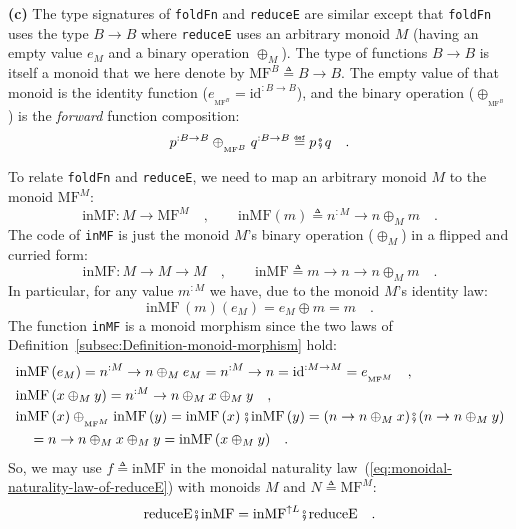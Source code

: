 \textbf{(c)} The type signatures of \lstinline!foldFn! and \lstinline!reduceE!
are similar except that \lstinline!foldFn! uses the type $B\rightarrow B$
where \lstinline!reduceE! uses an arbitrary monoid $M$ (having an
empty value $e_{M}$ and a binary operation $\oplus_{M}$). The type
of functions $B\rightarrow B$ is itself a monoid that we here denote
by $\text{MF}^{B}\triangleq B\rightarrow B$. The empty value of that
monoid is the identity function ($e_{_{\text{MF}^{B}}}=\text{id}^{:B\rightarrow B}$),
and the binary operation ($\ensuremath{\oplus}_{_{\text{MF}^{B}}}$)
is the \emph{forward} function composition: 
\[
p^{:B\rightarrow B}\oplus_{_{\text{MF}^{B}}}q^{:B\rightarrow B}\triangleq p\bef q\quad.
\]

To relate \lstinline!foldFn! and \lstinline!reduceE!, we need to
map an arbitrary monoid $M$ to the monoid $\text{MF}^{M}$:
\[
\text{inMF}:M\rightarrow\text{MF}^{M}\quad,\quad\quad\text{inMF}\left(m\right)\triangleq n^{:M}\rightarrow n\oplus_{M}m\quad.
\]
The code of \lstinline!inMF! is just the monoid $M$\textsf{'}s binary operation
($\oplus_{M}$) in a flipped and curried form:
\[
\text{inMF}:M\rightarrow M\rightarrow M\quad,\quad\quad\text{inMF}\triangleq m\rightarrow n\rightarrow n\oplus_{M}m\quad.
\]
In particular, for any value $m^{:M}$ we have, due to the monoid
$M$\textsf{'}s identity law: 
\begin{equation}
\text{inMF}\,(m)(e_{M})=e_{M}\oplus m=m\quad.\label{eq:identity-law-of-inMF}
\end{equation}
The function \lstinline!inMF! is a monoid morphism since the two
laws of Definition~\ref{subsec:Definition-monoid-morphism} hold:
\begin{align*}
 & \text{inMF}\,(e_{M})=n^{:M}\rightarrow n\oplus_{M}e_{M}=n^{:M}\rightarrow n=\text{id}^{:M\rightarrow M}=e_{_{\text{MF}^{M}}}\quad,\\
 & \text{inMF}\,(x\oplus_{M}y)=n^{:M}\rightarrow n\oplus_{M}x\oplus_{M}y\quad,\\
 & \text{inMF}\left(x\right)\oplus_{_{\text{MF}^{M}}}\text{inMF}\left(y\right)=\text{inMF}\left(x\right)\bef\text{inMF}\left(y\right)=(n\rightarrow n\oplus_{M}x)\bef(n\rightarrow n\oplus_{M}y)\\
 & \quad=n\rightarrow n\oplus_{M}x\oplus_{M}y=\text{inMF}\,(x\oplus_{M}y)\quad.
\end{align*}
So, we may use $f\triangleq\text{inMF}$ in the monoidal naturality
law~(\ref{eq:monoidal-naturality-law-of-reduceE}) with monoids $M$
and $N\triangleq\text{MF}^{M}$:
\begin{equation}
\text{reduceE}\bef\text{inMF}=\text{inMF}^{\uparrow L}\bef\text{reduceE}\quad.\label{eq:monoidal-naturality-law-of-reduceE-inMF}
\end{equation}

